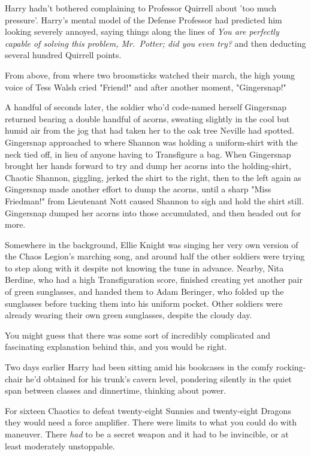 Harry hadn't bothered complaining to Professor Quirrell about 'too much 
pressure'. Harry's mental model of the Defense Professor had predicted him 
looking severely annoyed, saying things along the lines of \emph{You are 
perfectly capable of solving this problem, Mr.~Potter; did you even try?} and 
then deducting several hundred Quirrell points.

From above, from where two broomsticks watched their march, the high young 
voice of Tess Walsh cried "Friend!" and after another moment, "Gingersnap!"

A handful of seconds later, the soldier who'd code-named herself Gingersnap 
returned bearing a double handful of acorns, sweating slightly in the cool but 
humid air from the jog that had taken her to the oak tree Neville had spotted. 
Gingersnap approached to where Shannon was holding a uniform-shirt with the 
neck tied off, in lieu of anyone having to Transfigure a bag. When Gingersnap 
brought her hands forward to try and dump her acorns into the holding-shirt, 
Chaotic Shannon, giggling, jerked the shirt to the right, then to the left 
again as Gingersnap made another effort to dump the acorns, until a sharp "Miss 
Friedman!" from Lieutenant Nott caused Shannon to sigh and hold the shirt 
still. Gingersnap dumped her acorns into those accumulated, and then headed out 
for more.

Somewhere in the background, Ellie Knight was singing her very own version of 
the Chaos Legion's marching song, and around half the other soldiers were 
trying to step along with it despite not knowing the tune in advance. Nearby, 
Nita Berdine, who had a high Transfiguration score, finished creating yet 
another pair of green sunglasses, and handed them to Adam Beringer, who folded 
up the sunglasses before tucking them into his uniform pocket. Other soldiers 
were already wearing their own green sunglasses, despite the cloudy day.

You might guess that there was some sort of incredibly complicated and 
fascinating explanation behind this, and you would be right.

Two days earlier Harry had been sitting amid his bookcases in the comfy 
rocking-chair he'd obtained for his trunk's cavern level, pondering silently in 
the quiet span between classes and dinnertime, thinking about power.

For sixteen Chaotics to defeat twenty-eight Sunnies and twenty-eight Dragons 
they would need a force amplifier. There were limits to what you could do with 
maneuver. There \emph{had} to be a secret weapon and it had to be invincible, 
or at least moderately unstoppable.

